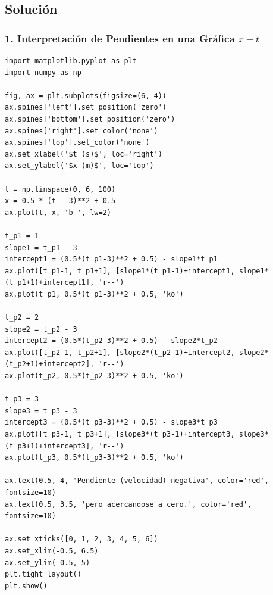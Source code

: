 \documentclass[12pt, a4paper]{article}
\begin{document}
\subsection*{Solución}

\subsubsection*{1. Interpretación de Pendientes en una Gráfica $x-t$}

\begin{lstlisting}
import matplotlib.pyplot as plt
import numpy as np

fig, ax = plt.subplots(figsize=(6, 4))
ax.spines['left'].set_position('zero')
ax.spines['bottom'].set_position('zero')
ax.spines['right'].set_color('none')
ax.spines['top'].set_color('none')
ax.set_xlabel('$t (s)$', loc='right')
ax.set_ylabel('$x (m)$', loc='top')

t = np.linspace(0, 6, 100)
x = 0.5 * (t - 3)**2 + 0.5
ax.plot(t, x, 'b-', lw=2)

t_p1 = 1
slope1 = t_p1 - 3
intercept1 = (0.5*(t_p1-3)**2 + 0.5) - slope1*t_p1
ax.plot([t_p1-1, t_p1+1], [slope1*(t_p1-1)+intercept1, slope1*(t_p1+1)+intercept1], 'r--')
ax.plot(t_p1, 0.5*(t_p1-3)**2 + 0.5, 'ko')

t_p2 = 2
slope2 = t_p2 - 3
intercept2 = (0.5*(t_p2-3)**2 + 0.5) - slope2*t_p2
ax.plot([t_p2-1, t_p2+1], [slope2*(t_p2-1)+intercept2, slope2*(t_p2+1)+intercept2], 'r--')
ax.plot(t_p2, 0.5*(t_p2-3)**2 + 0.5, 'ko')

t_p3 = 3
slope3 = t_p3 - 3
intercept3 = (0.5*(t_p3-3)**2 + 0.5) - slope3*t_p3
ax.plot([t_p3-1, t_p3+1], [slope3*(t_p3-1)+intercept3, slope3*(t_p3+1)+intercept3], 'r--')
ax.plot(t_p3, 0.5*(t_p3-3)**2 + 0.5, 'ko')

ax.text(0.5, 4, 'Pendiente (velocidad) negativa', color='red', fontsize=10)
ax.text(0.5, 3.5, 'pero acercandose a cero.', color='red', fontsize=10)

ax.set_xticks([0, 1, 2, 3, 4, 5, 6])
ax.set_xlim(-0.5, 6.5)
ax.set_ylim(-0.5, 5)
plt.tight_layout()
plt.show()
\end{lstlisting}
\end{document}
